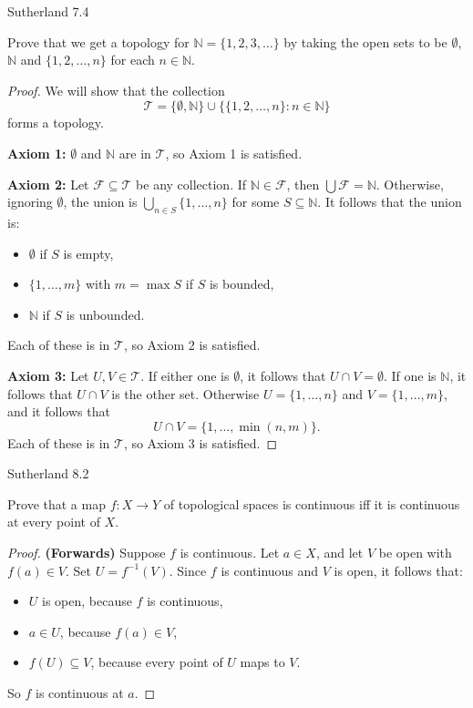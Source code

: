 \documentclass[minion]{homework}
\newcommand{\Nats}{\ensuremath{\mathbb N}} %
\begin{document}
\begin{problems}

\problem Sutherland 7.4

Prove that we get a topology for $\Nats = \{1, 2, 3, \dots\}$ by taking the open sets to be $\emptyset$, $\Nats$ and $\{1, 2, \dots, n\}$ for each $n \in \Nats$.

\begin{proof}
We will show that the collection
\[
\mathcal{T} = \{\emptyset, \Nats\} \cup \big\{\{1, 2, \dots, n\} : n \in \Nats\big\}
\]
forms a topology.

\textbf{Axiom 1:} $\emptyset$ and $\Nats$ are in $\mathcal{T}$, so Axiom 1 is satisfied.

\textbf{Axiom 2:} Let $\mathcal{F} \subseteq \mathcal{T}$ be any collection. If $\Nats \in \mathcal{F}$, then $\bigcup \mathcal{F} = \Nats$. Otherwise, ignoring $\emptyset$, the union is $\bigcup_{n \in S} \{1, \dots, n\}$ for some $S \subseteq \Nats$. It follows that the union is:
\begin{itemize}
  \item $\emptyset$ if $S$ is empty,
  \item $\{1, \dots, m\}$ with $m = \max S$ if $S$ is bounded,
  \item $\Nats$ if $S$ is unbounded.
\end{itemize}
Each of these is in $\mathcal{T}$, so Axiom 2 is satisfied.

\textbf{Axiom 3:} Let $U, V \in \mathcal{T}$. If either one is $\emptyset$, it follows that $U \cap V = \emptyset$. If one is $\Nats$, it follows that $U \cap V$ is the other set. Otherwise $U = \{1, \dots, n\}$ and $V = \{1, \dots, m\}$, and it follows that
\[
U \cap V = \{1, \dots, \min(n,m)\}.
\]
Each of these is in $\mathcal{T}$, so Axiom 3 is satisfied.
\end{proof}

\problem Sutherland 8.2

Prove that a map $f : X \to Y$ of topological spaces is continuous iff it is continuous at every point of $X$.

\begin{proof}
\textbf{(Forwards)} Suppose $f$ is continuous. Let $a \in X$, and let $V$ be open with $f(a) \in V$. Set $U = f^{-1}(V)$. Since $f$ is continuous and $V$ is open, it follows that:
\begin{itemize}
  \item $U$ is open, because $f$ is continuous,
  \item $a \in U$, because $f(a) \in V$,
  \item $f(U) \subseteq V$, because every point of $U$ maps to $V$.
\end{itemize}
So $f$ is continuous at $a$.


\end{proof}
\end{problems}
\end{document}
